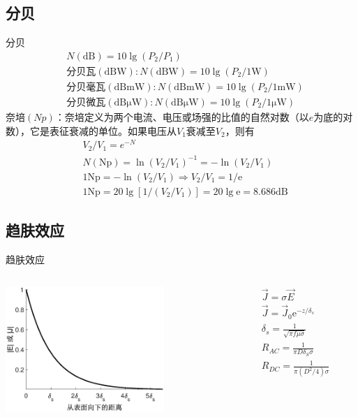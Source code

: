 \subsection{分贝}
\begin{frame}{分贝}
\begin{align*}
    &N(\mathrm{dB})=10\lg(P_2/P_1)\\
    &\text{分贝瓦}(\mathrm{dBW}):N(\mathrm{dBW})=10\lg(P_2/1\mathrm{W})\\
    &\text{分贝毫瓦}(\mathrm{dBmW}):N(\mathrm{dBmW})=10\lg(P_2/1\mathrm{mW})\\
    &\text{分贝微瓦}(\mathrm{dB\mu W}):N(\mathrm{dB\mu W})=10\lg(P_2/1\mathrm{\mu W})
\end{align*}
奈培$(Np)$：奈培定义为两个电流、电压或场强的比值的自然对数（以$e$为底的对数），它是表征衰减的单位。如果电压从$V_1$衰减至$V_2$，则有\\
\begin{align*}
    &V_2/V_1=e^{-N}\\
    &N(\mathrm{Np})=\ln(V_2/V_1)^{-1}=-\ln(V_2/V_1)\\
    &1\mathrm{Np}=-\ln(V_2/V_1)\Rightarrow V_2/V_1=1/\mathrm{e}\\
    &1\mathrm{Np}=20\lg[1/(V_2/V_1)]=20\lg\mathrm{e}=8.686\mathrm{dB}
\end{align*}
\end{frame}

\subsection{趋肤效应}
\begin{frame}{趋肤效应}
    \begin{columns}
        \begin{column}{0.6\linewidth}
            \centering
            \includegraphics[width=6cm]{Cha2//fig2_9.eps}
        \end{column}
        \begin{column}{0.4\linewidth}
            \centering
            \begin{align*}
                &\vec J = \sigma \vec E\\
                &\vec J = \vec J_0 \mathrm{e}^{-z/\delta_s}\\
                &\delta_s = \frac{1}{\sqrt{\pi f\mu\sigma}}\\
                & R_{AC} = \frac{1}{\pi D\delta_S\sigma} \\
                & R_{DC} = \frac{1}{\pi(D^2/4)\sigma}
            \end{align*}
        \end{column}
    \end{columns}

\end{frame}